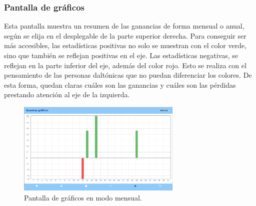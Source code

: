 \newpage

\subsubsection{Pantalla de gráficos}

Esta pantalla muestra un resumen de las ganancias de forma mensual o anual, según se elija en el desplegable de la parte superior derecha. Para conseguir ser más accesibles, las estadísticas positivas no solo se muestran con el color verde, sino que también se reflejan positivas en el eje. Las estadísticas negativas, se reflejan en la parte inferior del eje, además del color rojo. Esto se realiza con el pensamiento de las personas daltónicas que no puedan diferenciar los colores. De esta forma, quedan claras cuáles son las ganancias y cuáles son las pérdidas prestando atención al eje de la izquierda. 

\begin{figure}[H]
	\centering
	\includegraphics[width=0.7\textwidth]{imagenes/TerceraIteracion/graficosMensual.png}
	\caption{Pantalla de gráficos en modo mensual.}
\end{figure}

